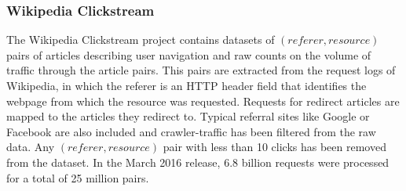 \subsubsection{Wikipedia Clickstream}
\label{sec:clickstream}
The Wikipedia Clickstream \cite{wulczyn} project contains datasets of $(referer, resource)$  pairs of articles describing user navigation and raw counts on the volume of traffic through the article pairs. This pairs are extracted from the request logs of Wikipedia, in which the referer is an HTTP header field that identifies the webpage from which the resource was requested. Requests for redirect articles are mapped to the articles they redirect to. Typical referral sites like Google or Facebook are also included and crawler-traffic has been filtered from the raw data. Any $(referer, resource)$   pair with less than 10 clicks has been removed from the dataset. In the March 2016 release, 6.8 billion requests were processed for a total of 25 million pairs.